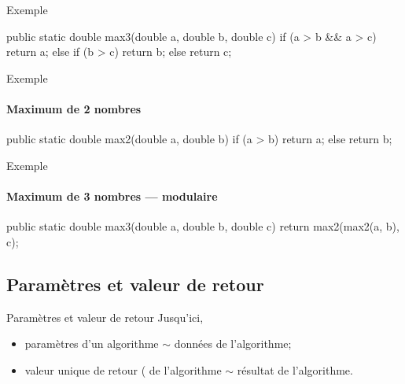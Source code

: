 \begin{hideedit}
\begin{frame}[fragile]{Exemple}
  \pause
  \vfill
  \begin{java}
public static double max3(double a, double b, double c) {
    if (a > b && a > c)
        return a;
    else if (b > c)
        return b;
    else
        return c;
}
  \end{java}
\end{frame}

\begin{frame}[fragile]{Exemple}
\framesubtitle{Maximum de 2 nombres}
  \begin{center}
  \end{center}

  \pause
  \vfill
  \begin{java}
public static double max2(double a, double b) {
    if (a > b)
        return a;
    else
        return b;
}
  \end{java}
\end{frame}

\begin{frame}[fragile]{Exemple}
\framesubtitle{Maximum de 3 nombres --- modulaire}
  \begin{center}
  \end{center}

  \pause
  \vfill
  \begin{java}
public static double max3(double a, double b, double c) {
    return max2(max2(a, b), c);
}
  \end{java}
\end{frame}

\subsection{Paramètres et valeur de retour}
\begin{frame}{Paramètres et valeur de retour}
  Jusqu'ici,
  \begin{itemize}
    \item paramètres d'un algorithme \(\sim\) données de l'algorithme;
    \item valeur unique de retour ( de l'algorithme \(\sim\)
      résultat de l'algorithme.
  \end{itemize}


\end{frame}
\end{hideedit}
